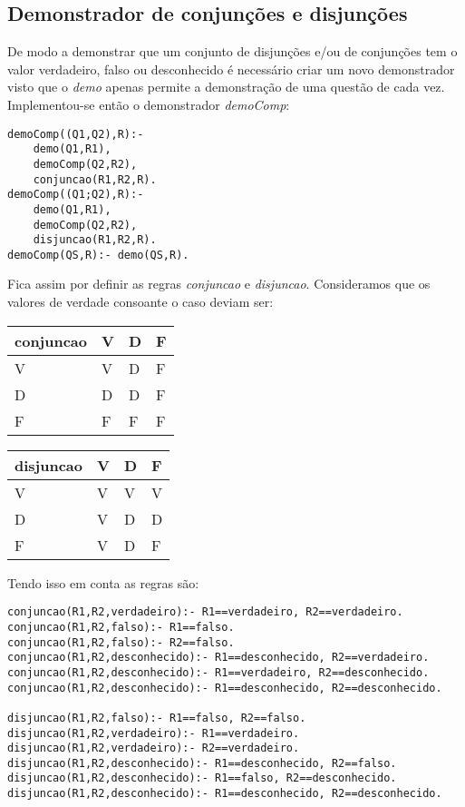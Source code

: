 \documentclass{article}
\begin{document}
\subsection{Demonstrador de conjunções e disjunções}
De modo a demonstrar que um conjunto de disjunções e/ou de conjunções tem o valor verdadeiro, falso ou desconhecido é necessário criar um novo demonstrador visto que o \textit{demo} apenas permite a demonstração de uma questão de cada vez. Implementou-se então o demonstrador \textit{demoComp}:
\begin{verbatim}
demoComp((Q1,Q2),R):-
    demo(Q1,R1),
    demoComp(Q2,R2),
    conjuncao(R1,R2,R).
demoComp((Q1;Q2),R):-
    demo(Q1,R1),
    demoComp(Q2,R2),
    disjuncao(R1,R2,R).
demoComp(QS,R):- demo(QS,R).
\end{verbatim}
Fica assim por definir as regras \textit{conjuncao} e \textit{disjuncao}. Consideramos que os valores de verdade consoante o caso deviam ser:
\newline
\begin{tabular}{ | l | l | l | l |}
    \hline
    conjuncao & V & D & F \\ \hline
    V & V & D & F \\ \hline
    D & D & D & F \\ \hline
    F & F & F & F \\
    \hline
\end{tabular}
\begin{tabular}{ | l | l | l | l |}
    \hline
    disjuncao & V & D & F \\ \hline
    V & V & V & V \\ \hline
    D & V & D & D \\ \hline
    F & V & D & F \\
    \hline
\end{tabular}

Tendo isso em conta as regras são:
\begin{verbatim}
conjuncao(R1,R2,verdadeiro):- R1==verdadeiro, R2==verdadeiro.
conjuncao(R1,R2,falso):- R1==falso.
conjuncao(R1,R2,falso):- R2==falso.
conjuncao(R1,R2,desconhecido):- R1==desconhecido, R2==verdadeiro.
conjuncao(R1,R2,desconhecido):- R1==verdadeiro, R2==desconhecido.
conjuncao(R1,R2,desconhecido):- R1==desconhecido, R2==desconhecido.

disjuncao(R1,R2,falso):- R1==falso, R2==falso.
disjuncao(R1,R2,verdadeiro):- R1==verdadeiro.
disjuncao(R1,R2,verdadeiro):- R2==verdadeiro.
disjuncao(R1,R2,desconhecido):- R1==desconhecido, R2==falso.
disjuncao(R1,R2,desconhecido):- R1==falso, R2==desconhecido.
disjuncao(R1,R2,desconhecido):- R1==desconhecido, R2==desconhecido.
\end{verbatim}
\end{document}
